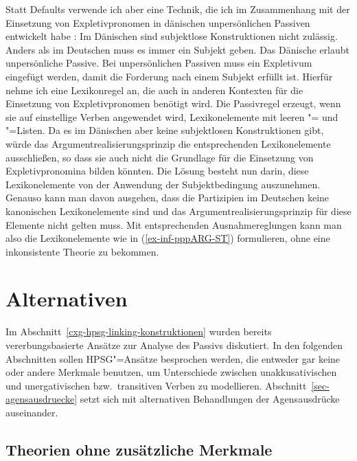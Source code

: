 {Statt Defaults verwende ich aber eine Technik, die ich im Zusammenhang mit der Einsetzung von
Expletivpronomen in dänischen unpersönlichen Passiven entwickelt habe
\citep{MuellerDanishImpersonalPassive}: Im Dänischen sind subjektlose Konstruktionen nicht zulässig.
Anders als im Deutschen muss es immer ein Subjekt geben. Das Dänische erlaubt unpersönliche
Passive. Bei unpersönlichen Passiven muss ein Expletivum eingefügt werden, damit die Forderung nach
einem Subjekt erfüllt ist. Hierfür nehme ich eine Lexikonregel an, die auch in anderen Kontexten für
die Einsetzung von Expletivpronomen benötigt wird. Die Passivregel erzeugt, wenn sie auf einstellige
Verben angewendet wird, Lexikonelemente mit leeren
\subj"= und \comps"=Listen. Da es im Dänischen aber keine subjektlosen Konstruktionen gibt, würde
das Argumentrealisierungsprinzip die entsprechenden Lexikonelemente ausschließen, so dass sie auch
nicht die Grundlage für die Einsetzung von Expletivpronomina bilden könnten. Die Lösung besteht nun
darin, diese Lexikonelemente von der Anwendung der Subjektbedingung auszunehmen. Genauso kann man
davon ausgehen, dass die Partizipien im Deutschen keine kanonischen Lexikonelemente sind und das
Argumentrealisierungsprinzip für diese Elemente nicht gelten muss. Mit entsprechenden
Ausnahmereglungen kann man also die Lexikonelemente wie in (\ref{ex-inf-pppARG-ST}) formulieren, ohne eine
inkonsistente Theorie zu bekommen.%

\section{Alternativen}

Im Abschnitt~\ref{cxg-hpsg-linking-konstruktionen} wurden bereits vererbungsbasierte Ansätze zur
Analyse des Passivs diskutiert. In den folgenden Abschnitten sollen HPSG"=Ansätze besprochen werden,
die entweder gar keine oder andere Merkmale benutzen, um Unterschiede zwischen unakkusativischen und
unergativischen bzw.\ transitiven Verben zu modellieren. Abschnitt~\ref{sec-agensausdruecke} setzt
sich mit alternativen Behandlungen der Agensausdrücke auseinander.
\largerpage

\subsection{Theorien ohne zusätzliche Merkmale}

}
